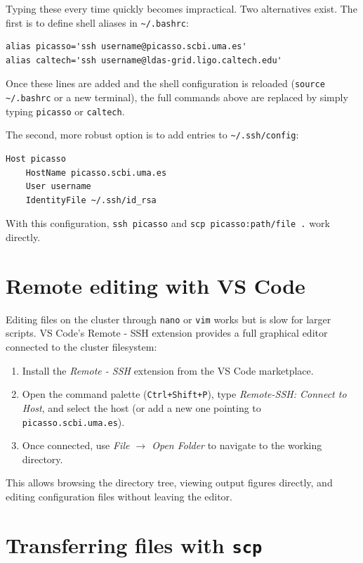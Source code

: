 Typing these every time quickly becomes impractical. Two alternatives exist. The first is to define shell aliases in \texttt{\textasciitilde/.bashrc}:

\begin{verbatim}
alias picasso='ssh username@picasso.scbi.uma.es'
alias caltech='ssh username@ldas-grid.ligo.caltech.edu'
\end{verbatim}

Once these lines are added and the shell configuration is reloaded (\texttt{source \textasciitilde/.bashrc} or a new terminal), the full commands above are replaced by simply typing \texttt{picasso} or \texttt{caltech}.

The second, more robust option is to add entries to \texttt{\textasciitilde/.ssh/config}:

\begin{verbatim}
Host picasso
    HostName picasso.scbi.uma.es
    User username
    IdentityFile ~/.ssh/id_rsa
\end{verbatim}

With this configuration, \texttt{ssh picasso} and \texttt{scp picasso:path/file .} work directly.

\section{Remote editing with VS Code}

Editing files on the cluster through \texttt{nano} or \texttt{vim} works but is slow for larger scripts. VS Code's {Remote - SSH} extension provides a full graphical editor connected to the cluster filesystem:

\begin{enumerate}
  \item Install the \textit{Remote - SSH} extension from the VS Code marketplace.
  \item Open the command palette (\texttt{Ctrl+Shift+P}), type \textit{Remote-SSH: Connect to Host}, and select the host (or add a new one pointing to \texttt{picasso.scbi.uma.es}).
  \item Once connected, use \textit{File $\to$ Open Folder} to navigate to the working directory.
\end{enumerate}

This allows browsing the directory tree, viewing output figures directly, and editing configuration files without leaving the editor.

\section{Transferring files with \texttt{scp}}

